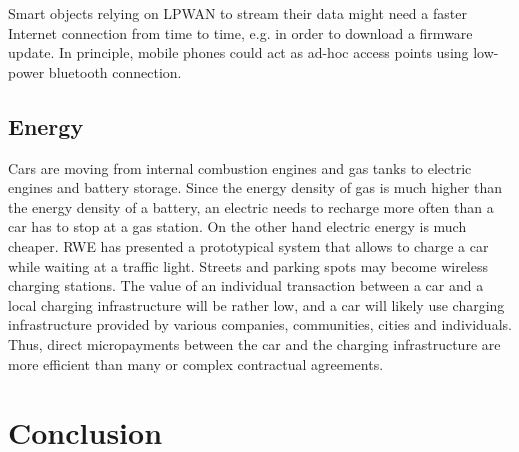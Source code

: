 Smart objects relying on LPWAN to stream their data might need a faster Internet connection from time to time, e.g. in order to download a firmware update. In principle, mobile phones could act as ad-hoc access points using low-power bluetooth connection. 

\subsection{Energy}

Cars are moving from internal combustion engines and gas tanks to electric engines and battery storage. Since the energy density of gas is much higher than the energy density of a battery, an electric needs to recharge more often than a car has to stop at a gas station. On the other hand electric energy is much cheaper. RWE has presented a prototypical system that allows to charge a car while waiting at a traffic light. Streets and parking spots may become wireless charging stations. The value of an individual transaction between a car and a local charging infrastructure will be rather low, and a car will likely use charging infrastructure provided by various companies, communities, cities and individuals. Thus, direct micropayments between the car and the charging infrastructure are more efficient than many or complex contractual agreements.


\section{Conclusion}










